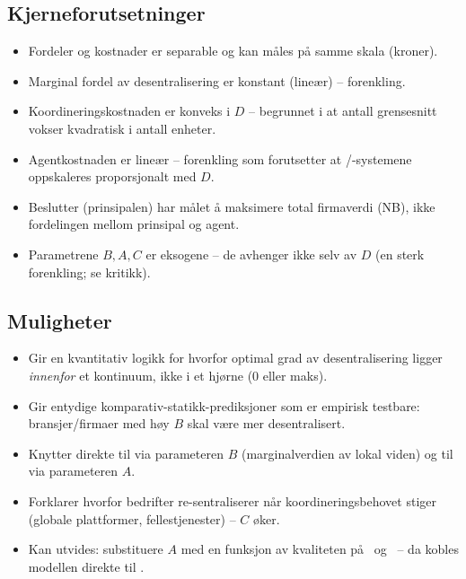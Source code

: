 \subsection*{Kjerneforutsetninger}
\begin{itemize}\setlength{\itemsep}{2pt}
\item Fordeler og kostnader er separable og kan måles på samme skala (kroner).
\item Marginal fordel av desentralisering er konstant (lineær) -- forenkling.
\item Koordineringskostnaden er konveks i $D$ -- begrunnet i at antall grensesnitt vokser kvadratisk i antall enheter.
\item Agentkostnaden er lineær -- forenkling som forutsetter at \STwo/\SThree-systemene oppskaleres proporsjonalt med $D$.
\item Beslutter (prinsipalen) har målet å maksimere total firmaverdi (NB), ikke fordelingen mellom prinsipal og agent.
\item Parametrene $B, A, C$ er eksogene -- de avhenger ikke selv av $D$ (en sterk forenkling; se kritikk).
\end{itemize}

\subsection*{Muligheter}
\begin{itemize}\setlength{\itemsep}{2pt}
\item Gir en kvantitativ logikk for hvorfor optimal grad av desentralisering ligger \emph{innenfor} et kontinuum, ikke i et hjørne (0 eller maks).
\item Gir entydige komparativ-statikk-prediksjoner som er empirisk testbare: bransjer/firmaer med høy $B$ skal være mer desentralisert.
\item Knytter direkte til  via parameteren $B$ (marginalverdien av lokal viden) og til  via parameteren $A$.
\item Forklarer hvorfor bedrifter re-sentraliserer når koordineringsbehovet stiger (globale plattformer, fellestjenester) -- $C$ øker.
\item Kan utvides: substituere $A$ med en funksjon av kvaliteten på \STwo\ og \SThree\ -- da kobles modellen direkte til .
\end{itemize}

